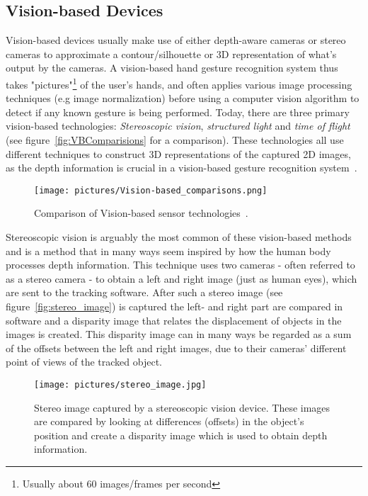 \subsection{Vision-based Devices} 
Vision-based devices usually make use of either depth-aware cameras or stereo cameras to approximate a contour/silhouette or 
3D representation of what's output by the cameras. A vision-based hand gesture recognition system thus takes "pictures"\footnote{Usually about 60 images/frames per second} of the 
user's hands, and often applies various image processing techniques (e.g image normalization) before using a computer vision algorithm to detect if any known gesture is 
being performed. Today, there are three primary vision-based technologies: \textit{Stereoscopic vision}, \textit{structured light} and 
\textit{time of flight}~\citep{Ko2012} (see figure~\vref{fig:VBComparisions} for a comparison). 
These technologies all use different techniques to construct 3D representations of the captured 2D images, as the 
depth information is crucial in a vision-based gesture recognition system~\citep{Ko2012}.

\begin{figure}%
	\texttt{[image: pictures/Vision-based\_comparisons.png]}
	\caption{Comparison of Vision-based sensor technologies~\citep{Ko2012}.}
	\label{fig:VBComparisions}
\end{figure} 

Stereoscopic vision is arguably the most common of these vision-based methods and is a method that in many ways seem inspired by how the human body processes depth information.
This technique uses two cameras - often referred to as a stereo camera - to obtain a left and right image (just as human eyes), which are sent to
the tracking software. After such a stereo image (see figure~\vref{fig:stereo_image}) is captured the left- and right part are compared in software and a disparity image that relates the 
displacement of objects in the images is created. This disparity image can in many ways be regarded as a sum of the offsets between the left and right images,
due to their cameras' different point of views of the tracked object. 

\begin{figure}%
	\texttt{[image: pictures/stereo\_image.jpg]}
	\caption[Stereo image captured by a stereoscopic vision device]{Stereo image captured by a stereoscopic vision device. These images are compared by looking at differences
	(offsets) in the object's position and create a disparity image which is used to obtain depth information.}
	\label{fig:stereo_image}
\end{figure} 

